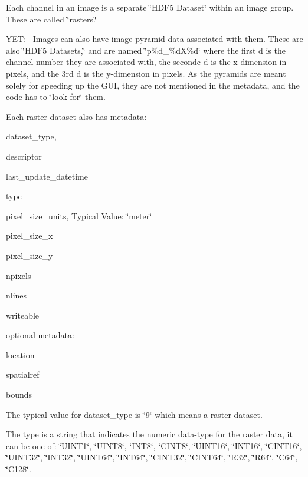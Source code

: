 Each channel in an image is a separate \char`\"{}\+H\+D\+F5 Dataset\char`\"{} within an image group. These are called \char`\"{}rasters.\char`\"{}

Y\+E\+T\+:~\newline
Images can also have image pyramid data associated with them. These are also \char`\"{}\+H\+D\+F5 Datasets,\char`\"{} and are named \char`\"{}p\%d\+\_\+\%d\+X\%d\char`\"{} where the first {\ttfamily d} is the channel number they are associated with, the secondc d is the x-\/dimension in pixels, and the 3rd {\ttfamily d} is the y-\/dimension in pixels. As the pyramids are meant solely for speeding up the G\+U\+I, they are not mentioned in the metadata, and the code has to \char`\"{}look for\char`\"{} them.

Each raster dataset also has metadata\+:

\begin{DoxyItemize}
\item dataset\+\_\+type, \item descriptor \item last\+\_\+update\+\_\+datetime \item type \item pixel\+\_\+size\+\_\+units, Typical Value\+: \char`\"{}meter\char`\"{} \item pixel\+\_\+size\+\_\+x \item pixel\+\_\+size\+\_\+y \item npixels \item nlines \item writeable\end{DoxyItemize}
optional metadata\+: \begin{DoxyItemize}
\item location \item spatialref \item bounds\end{DoxyItemize}
The typical value for dataset\+\_\+type is \char`\"{}9\char`\"{} which means a raster dataset.

The type is a string that indicates the numeric data-\/type for the raster data, it can be one of\+: {\ttfamily \char`\"{}\+U\+I\+N\+T1\char`\"{}}, {\ttfamily \char`\"{}\+U\+I\+N\+T8\char`\"{}}, {\ttfamily \char`\"{}\+I\+N\+T8\char`\"{}}, {\ttfamily \char`\"{}\+C\+I\+N\+T8\char`\"{}}, {\ttfamily \char`\"{}\+U\+I\+N\+T16\char`\"{}}, {\ttfamily \char`\"{}\+I\+N\+T16\char`\"{}}, {\ttfamily \char`\"{}\+C\+I\+N\+T16\char`\"{}}, {\ttfamily \char`\"{}\+U\+I\+N\+T32\char`\"{}}, {\ttfamily \char`\"{}\+I\+N\+T32\char`\"{}}, {\ttfamily \char`\"{}\+U\+I\+N\+T64\char`\"{}}, {\ttfamily \char`\"{}\+I\+N\+T64\char`\"{}}, {\ttfamily \char`\"{}\+C\+I\+N\+T32\char`\"{}}, {\ttfamily \char`\"{}\+C\+I\+N\+T64\char`\"{}}, {\ttfamily \char`\"{}\+R32\char`\"{}}, {\ttfamily \char`\"{}\+R64\char`\"{}}, {\ttfamily \char`\"{}\+C64\char`\"{}}, {\ttfamily \char`\"{}\+C128\char`\"{}}.

